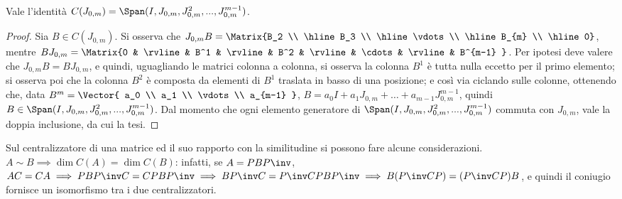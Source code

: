 \documentclass[11pt]{article}
\begin{document}
	\begin{proposition}
		Vale l'identità $C(J_{0, m}) = \Span(I, J_{0, m}, J_{0, m}^2, ..., J_{0, m}^{m-1})$.
	\end{proposition}

	\begin{proof}
		Sia $B \in C(J_{0, m})$. Si osserva che $J_{0,m} B = \Matrix{B_2 \\ \hline B_3 \\ \hline \vdots \\ \hline B_{m} \\ \hline 0}$, mentre $B J_{0,m} = \Matrix{0 & \rvline & B^1 & \rvline & B^2 & \rvline & \cdots & \rvline & B^{m-1} }$. Per ipotesi deve valere che $J_{0,m} B = B J_{0,m}$, e quindi, uguagliando le matrici colonna a colonna, si osserva
		la colonna $B^1$ è tutta nulla eccetto per il primo elemento; si osserva poi che la colonna $B^2$ è composta
		da elementi di $B^1$ traslata in basso di una posizione; e così via ciclando sulle colonne, ottenendo che,
		data $B^m = \Vector{ a_0 \\ a_1 \\ \vdots \\ a_{m-1} }$, $B = a_0 I + a_1 J_{0,m} + \ldots + a_{m-1} J_{0, m}^{m-1}$,
		quindi $B \in \Span(I, J_{0, m}, J_{0, m}^2, ..., J_{0, m}^{m-1})$. Dal momento che ogni elemento generatore di
		$\Span(I, J_{0, m}, J_{0, m}^2, ..., J_{0, m}^{m-1})$ commuta con $J_{0,m}$, vale la doppia inclusione, da cui
		la tesi.
	\end{proof}

	\begin{remark}
		Sul centralizzatore di una matrice ed il suo rapporto con la
		similitudine si possono fare alcune considerazioni. \\
		
		\li $A \sim B \implies \dim C(A) = \dim C(B)$: infatti, se
		$A = PBP\inv$, $AC = CA \implies PBP\inv C = C PBP\inv \implies
		BP\inv C=P\inv C P B P\inv \implies B (P\inv C P) = (P\inv C P) B$,
		e quindi il coniugio fornisce un isomorfismo tra i due
		centralizzatori.
	\end{remark}
	
\end{document}
